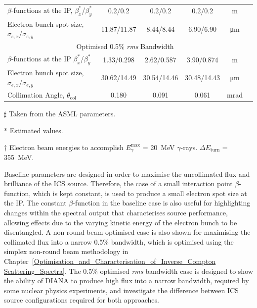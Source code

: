 \documentclass[../main.tex]{subfiles}
\begin{document}
\begin{table}[!h]
\begin{threeparttable}
\begin{tabular}{lccccc}
\hline
$\beta$-functions at the IP, $\beta_{x}^{*}$/$\beta_{y}^{*}$ & 0.2/0.2 & 0.2/0.2 & 0.2/0.2 & \si{\meter} \\
Electron bunch spot size, $\sigma_{e,x}$/$\sigma_{e,y}$ & 11.87/11.87 & 8.44/8.44 & 6.90/6.90 & \si{\micro\meter}\\
\hline\multicolumn{5}{c}{Optimised 0.5\% \textit{rms} Bandwidth} \\
\hline
$\beta$-functions at the IP $\beta_{x}^{*}$/$\beta_{y}^{*}$ & 1.33/0.298 & 2.62/0.587 & 3.90/0.874 & \si{\meter} \\
Electron bunch spot size, $\sigma_{e,x}$/$\sigma_{e,y}$ & 30.62/14.49 & 30.54/14.46 & 30.48/14.43 & \si{\micro\meter}\\
Collimation Angle, $\theta_{\mathrm{col}}$ & 0.180 & 0.091 & 0.061 & \si{\milli\radian} \\ 
\hline\hline
\end{tabular}
\begin{tablenotes}
\item[$\sharp$]{Taken from the ASML parameters.}
\item[*]{Estimated values.}
\item[$\dagger$]{Electron beam energies to accomplish $E_{\gamma}^{\mathrm{max}}$ = 20~\si{\mega\electronvolt} $\gamma$-rays. $\Delta E_{\mathrm{turn}}$ = 355~\si{\mega\electronvolt}.}
\end{tablenotes}
\end{threeparttable}
\label{tab:DIANA_electron_beam_design_parameters}
\end{table}

Baseline parameters are designed in order to maximise the uncollimated flux and brilliance of the ICS source. Therefore, the case of a small interaction point $\beta$-function, which is kept constant, is used to produce a small electron spot size at the IP. The constant $\beta$-function in the baseline case is also useful for highlighting changes within the spectral output that characterises source performance, allowing effects due to the varying kinetic energy of the electron bunch to be disentangled. A non-round beam optimised case is also shown for maximising the collimated flux into a narrow 0.5\% bandwidth, which is optimised using the simplex non-round beam methodology in Chapter~\ref{Optimisation_and_Characterisation_of_Inverse_Compton Scattering_Spectra}. The 0.5\% optimised \textit{rms} bandwidth case is designed to show the ability of DIANA to produce high flux into a narrow bandwidth, required by some nuclear physics experiments, and investigate the difference between ICS source configurations required for both approaches. 
\end{document}
